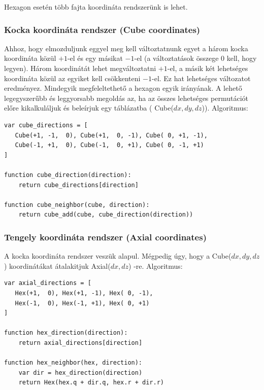 Hexagon esetén több fajta koordináta rendszerünk is lehet.

\subsubsection{Kocka koordináta rendszer (Cube coordinates)}

\noindent Ahhoz, hogy elmozduljunk eggyel meg kell változtatnunk egyet a három kocka koordináta közül $+1$-el és egy másikat $-1$-el (a változtatások összege $0$ kell, hogy legyen). Három koordinátát lehet megváltoztatni $+1$-el, a másik két lehetséges koordináta közül az egyiket kell csökkenteni $-1$-el. Ez hat lehetséges változatot eredményez. Mindegyik megfeleltethető a hexagon egyik irányának. A lehető legegyszerűbb és leggyorsabb megoldás az, ha az összes lehetséges permutációt előre kikalkuláljuk és beleírjuk egy táblázatba ( Cube($dx, dy, dz$)).
\newline
\newline Algoritmus: 
\begin{verbatim}
var cube_directions = [
   Cube(+1, -1,  0), Cube(+1,  0, -1), Cube( 0, +1, -1),
   Cube(-1, +1,  0), Cube(-1,  0, +1), Cube( 0, -1, +1)
]

function cube_direction(direction):
    return cube_directions[direction]

function cube_neighbor(cube, direction):
    return cube_add(cube, cube_direction(direction))
\end{verbatim}

\subsubsection{Tengely koordináta rendszer (Axial coordinates)}

\noindent A kocka koordináta rendszer veszük alapul. Mégpedig úgy, hogy a Cube($ dx, dy, dz$) koordinátákat átalakitjuk Axial($ dx, dz$) -re.
\newline
\newline Algoritmus:
\begin{verbatim}
var axial_directions = [
   Hex(+1,  0), Hex(+1, -1), Hex( 0, -1),
   Hex(-1,  0), Hex(-1, +1), Hex( 0, +1)
]

function hex_direction(direction):
    return axial_directions[direction]

function hex_neighbor(hex, direction):
    var dir = hex_direction(direction)
    return Hex(hex.q + dir.q, hex.r + dir.r)
\end{verbatim}

